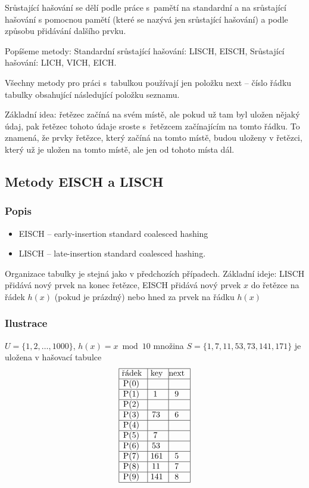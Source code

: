 \documentclass[a4paper,12pt]{article}
\begin{document}
Srůstající hašování se dělí podle práce s~pamětí na standardní a na srůstající hašování 
s pomocnou pamětí (které se nazývá jen 
srůstající hašování) a podle způsobu 
přidávání dalšího prvku.

Popíšeme metody:\newline 
\phantom{---}Standardní srůstající hašování: LISCH, EISCH,\newline 
\phantom{---}Srůstající hašování: LICH, VICH, EICH.

Všechny metody pro práci s~tabulkou používají jen 
položku next -- číslo řádku tabulky obsahující 
následující položku seznamu. 

Základní idea: řetězec začíná na svém místě, ale 
pokud už tam byl uložen 
nějaký údaj, pak řetězec tohoto údaje sroste s~řetězcem 
začínajícím na tomto řádku. To znamená, že prvky řetězce, který začíná na tomto místě, budou uloženy v řetězci, který už je uložen na tomto místě, ale jen od tohoto místa dál.

\subsection{Metody EISCH a LISCH}

\subsubsection{Popis}
\begin{itemize}
\item EISCH -- early-insertion standard coalesced hashing 
\item LISCH -- late-insertion standard coalesced hashing.
\end{itemize}

Organizace tabulky je stejná jako v předchozích 
případech.\newline 
Základní ideje: LISCH přidává nový prvek na konec 
řetězce, \newline 
EISCH přidává nový prvek $x$ do řetězce na 
řádek $h(x)$ (pokud je prázdný) nebo hned za prvek na řádku $h(x)$\newline 

\subsubsection{Ilustrace}

$U=\{1,2,\dots,1000\}$, $h(x)=x\bmod10$\newline 
množina $S=\{1,7,11,53,73,141,171\}$ je uložena 
v hašovací tabulce
$$\vtop{\offinterlineskip\halign {\strut\vrule\ # & \vrule\ # & \vrule \hfil # \hfil \vrule\cr\noalign{\hrule}řádek & key & next \hfil \cr\noalign{\hrule}P(0) & &\hfill \cr\noalign{\hrule}P(1) & 1 & 9 \cr\noalign{\hrule}P(2) & &\hfill \cr\noalign{\hrule}P(3) & 73 & 6 \cr\noalign{\hrule}P(4) &  &\hfill \cr\noalign{\hrule}P(5) & 7 & \hfill \cr\noalign{\hrule}P(6) & 53 &\hfill \cr\noalign{\hrule}P(7) & 161 & 5 \cr\noalign{\hrule}P(8) & 11 & 7  \cr\noalign{\hrule}P(9) & 141 & 8 \cr\noalign{\hrule}}}$$
\end{document}
